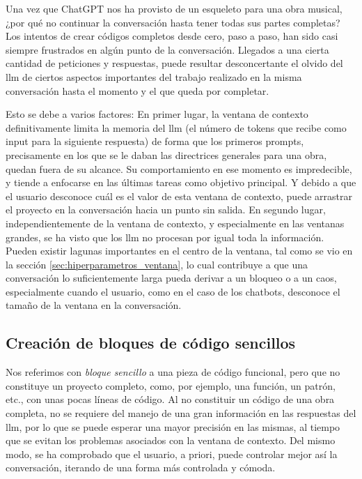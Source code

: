 Una vez que ChatGPT nos ha provisto de un esqueleto para una obra musical, ¿por qué no continuar la conversación hasta tener todas sus partes completas? Los intentos de crear códigos completos desde cero, paso a paso, han sido casi siempre frustrados en algún punto de la conversación. Llegados a una cierta cantidad de peticiones y respuestas, puede resultar desconcertante el olvido del  \gls{llm} de ciertos aspectos importantes del trabajo realizado en la misma conversación hasta el momento y el que queda por completar. 


Esto se debe a varios factores: En primer lugar, la ventana de contexto definitivamente limita la memoria del \gls{llm} (el número de tokens que recibe como input para la siguiente respuesta) de forma que los primeros prompts, precisamente en los que se le daban las directrices generales para una obra, quedan fuera de su alcance. Su comportamiento en ese momento es impredecible, y tiende a enfocarse en las últimas tareas como objetivo principal. Y debido a que el usuario desconoce cuál es el valor de esta ventana de contexto, puede arrastrar el proyecto en la conversación hacia un punto sin salida. En segundo lugar, independientemente de la ventana de contexto, y especialmente en las ventanas grandes, se ha visto que los \gls{llm} no procesan por igual toda la información. Pueden existir lagunas importantes en el centro de la ventana, tal como se vio en la sección \ref{sec:hiperparametros_ventana}, lo cual contribuye a que una conversación lo suficientemente larga pueda derivar a un bloqueo o a un caos, especialmente cuando el usuario, como en el caso de los chatbots, desconoce el tamaño de la ventana en la conversación.

\subsection{Creación de bloques de código sencillos}

Nos referimos con \emph{bloque sencillo} a una pieza de código funcional, pero que no constituye un proyecto completo, como, por ejemplo, una función, un patrón, etc., con unas pocas líneas de código. Al no constituir un código de una obra completa, no se requiere del manejo de una gran información en las respuestas del \gls{llm}, por lo que se puede esperar una mayor precisión en las mismas, al tiempo que se evitan los problemas asociados con la ventana de contexto. Del mismo modo, se ha comprobado que el usuario, a priori, puede controlar mejor así la conversación, iterando de una forma más controlada y cómoda. 

